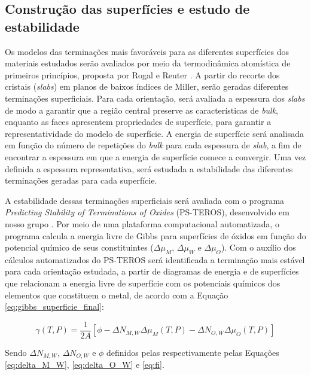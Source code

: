 \subsection{Construção das superfícies e estudo de estabilidade }
Os modelos das terminações mais favoráveis para as diferentes superfícies dos materiais estudados serão avaliados por meio da termodinâmica atomística de primeiros princípios, proposta por Rogal e Reuter \cite{rogal2006}. A partir do recorte dos cristais (\textit{slabs}) em planos de baixos índices de Miller, serão geradas diferentes terminações superficiais. Para cada orientação, será avaliada a espessura dos \textit{slabs} de modo a garantir que a região central preserve as características de \textit{bulk}, enquanto as faces apresentem propriedades de superfície, para garantir a representatividade do modelo de superfície. A energia de superfície será analisada em função do número de repetições do \textit{bulk} para cada espessura de \textit{slab}, a fim de encontrar a espessura em que a energia de superfície comece a convergir. Uma vez definida a espessura representativa, será estudada a estabilidade das diferentes terminações geradas para cada superfície.

A estabilidade dessas terminações superficiais será avaliada com o programa \textit{Predicting Stability of Terminations of Oxides} (PS-TEROS), desenvolvido em nosso grupo \cite{dorini2025accelerating}. Por meio de uma plataforma computacional automatizada, o programa calcula a energia livre de Gibbs para superfícies de óxidos em função do potencial químico de seus constituintes (${\Delta}{\mu}_M$, ${\Delta}{\mu}_W$ e ${\Delta}{\mu}_O$). Com o auxílio dos cálculos automatizados do PS-TEROS será identificada a terminação mais estável para cada orientação estudada, a partir de diagramas de energia e de superfícies que relacionam a energia livre de superfície com os potenciais químicos dos elementos que constituem o metal, de acordo com a Equação \ref{eq:gibbs_superficie_final}:

\begin{dmath}
\gamma(T,P) = \frac{1}{2A} \left[ \phi - \Delta N_{M,W}\Delta \mu_{M}(T,P) - \Delta N_{O,W}\Delta \mu_{O}(T,P) \right]
\label{eq:gibbs_superficie_final}
\end{dmath}

Sendo $\Delta N_{M,W}$, $\Delta N_{O,W}$ e $\phi$ definidos pelas respectivamente pelas Equações \ref{eq:delta_M_W}, \ref{eq:delta_O_W} e \ref{eq:fi}.

